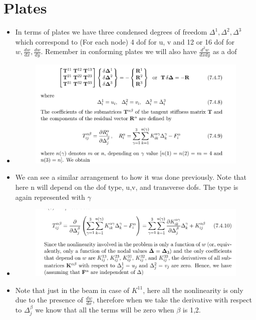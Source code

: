 \section{Plates}


	\begin{frame}
		\begin{itemize}
			\item In terms of plates we have three condensed degrees of freedom $\Delta^{1},\Delta^{2},\Delta^{3}$ which correspond to (For each node) 4 dof for u, v and 12 or 16 dof for $w, \frac{dw}{dx}, \frac{dw}{dy}$. Remember in conforming plates we will also have $\frac{d^{2}w}{dxdy}$ as a dof
			\item %
			\begin{figure}
				\centering
				\includegraphics[width=0.8\linewidth]{Figure/6}
				\label{fig:6}
			\end{figure}
			\item We can see a similar arrangement to how it was done previously. Note that here n will depend on the dof type, u,v, and transverse dofs. The type is again represented with $\gamma$
			
		\end{itemize}
	\end{frame}


	\begin{frame}
		\begin{itemize}
			\item %
			\begin{figure}
				\centering
				\includegraphics[width=0.8\linewidth]{Figure/7}
				\label{fig:7}
			\end{figure}
			\item Note that just in the beam in case of $K^{11}$, here all the nonlinearity is only due to the presence of $\frac{dw}{dx}$, therefore when we take the derivative with respect to $\Delta ^{\beta}_j$ we know that all the terms will be zero when $\beta$ is 1,2.  
			
			
		\end{itemize}
	\end{frame}



